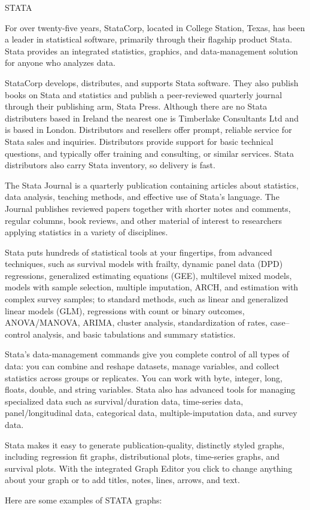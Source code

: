                                                        STATA

For over twenty-five years, StataCorp, located in College Station, Texas, has been a leader in statistical software, primarily through their flagship product Stata. Stata provides an integrated statistics, graphics, and data-management solution for anyone who analyzes data. 

StataCorp develops, distributes, and supports Stata software. They also publish books on Stata and statistics and publish a peer-reviewed quarterly journal through their publishing arm, Stata Press. 
Although there are no Stata distributers based in Ireland the nearest one is Timberlake Consultants Ltd and is based in London. Distributors and resellers offer prompt, reliable service for Stata sales and inquiries. Distributors provide support for basic technical questions, and typically offer training and consulting, or similar services. Stata distributors also carry Stata inventory, so delivery is fast. 

The Stata Journal is a quarterly publication containing articles about statistics, data analysis, teaching methods, and effective use of Stata's language. The Journal publishes reviewed papers together with shorter notes and comments, regular columns, book reviews, and other material of interest to researchers applying statistics in a variety of disciplines. 

Stata puts hundreds of statistical tools at your fingertips, from advanced techniques, such as survival models with frailty, dynamic panel data (DPD) regressions, generalized estimating equations (GEE), multilevel mixed models, models with sample selection, multiple imputation, ARCH, and estimation with complex survey samples; to standard methods, such as linear and generalized linear models (GLM), regressions with count or binary outcomes, ANOVA/MANOVA, ARIMA, cluster analysis, standardization of rates, case–control analysis, and basic tabulations and summary statistics. 

Stata’s data-management commands give you complete control of all types of data: you can combine and reshape datasets, manage variables, and collect statistics across groups or replicates. You can work with byte, integer, long, floats, double, and string variables. Stata also has advanced tools for managing specialized data such as survival/duration data, time-series data, panel/longitudinal data, categorical data, multiple-imputation data, and survey data. 

Stata makes it easy to generate publication-quality, distinctly styled graphs, including regression fit graphs, distributional plots, time-series graphs, and survival plots. With the integrated Graph Editor you click to change anything about your graph or to add titles, notes, lines, arrows, and text. 

Here are some examples of STATA graphs:

 

 

 







